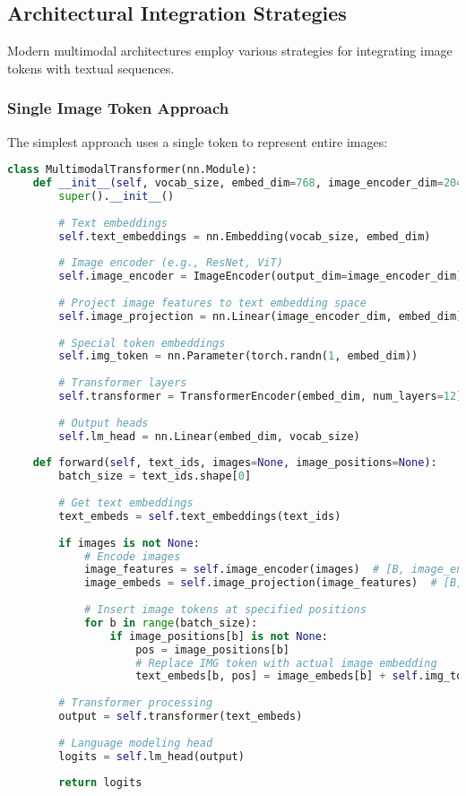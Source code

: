 \subsection{Architectural Integration Strategies}

Modern multimodal architectures employ various strategies for integrating image tokens with textual sequences.

\subsubsection{Single Image Token Approach}

The simplest approach uses a single token to represent entire images:

\begin{lstlisting}[language=Python, caption=Single image token integration in multimodal transformer]
class MultimodalTransformer(nn.Module):
    def __init__(self, vocab_size, embed_dim=768, image_encoder_dim=2048):
        super().__init__()
        
        # Text embeddings
        self.text_embeddings = nn.Embedding(vocab_size, embed_dim)
        
        # Image encoder (e.g., ResNet, ViT)
        self.image_encoder = ImageEncoder(output_dim=image_encoder_dim)
        
        # Project image features to text embedding space
        self.image_projection = nn.Linear(image_encoder_dim, embed_dim)
        
        # Special token embeddings
        self.img_token = nn.Parameter(torch.randn(1, embed_dim))
        
        # Transformer layers
        self.transformer = TransformerEncoder(embed_dim, num_layers=12)
        
        # Output heads
        self.lm_head = nn.Linear(embed_dim, vocab_size)
    
    def forward(self, text_ids, images=None, image_positions=None):
        batch_size = text_ids.shape[0]
        
        # Get text embeddings
        text_embeds = self.text_embeddings(text_ids)
        
        if images is not None:
            # Encode images
            image_features = self.image_encoder(images)  # [B, image_encoder_dim]
            image_embeds = self.image_projection(image_features)  # [B, embed_dim]
            
            # Insert image tokens at specified positions
            for b in range(batch_size):
                if image_positions[b] is not None:
                    pos = image_positions[b]
                    # Replace IMG token with actual image embedding
                    text_embeds[b, pos] = image_embeds[b] + self.img_token.squeeze(0)
        
        # Transformer processing
        output = self.transformer(text_embeds)
        
        # Language modeling head
        logits = self.lm_head(output)
        
        return logits
\end{lstlisting}

